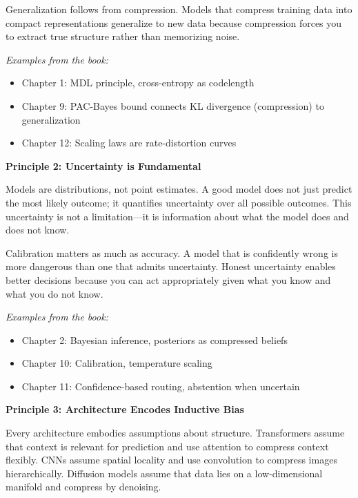 Generalization follows from compression. Models that compress training data into compact representations generalize to new data because compression forces you to extract true structure rather than memorizing noise.

\textit{Examples from the book:}
\begin{itemize}
\item Chapter 1: MDL principle, cross-entropy as codelength
\item Chapter 9: PAC-Bayes bound connects KL divergence (compression) to generalization
\item Chapter 12: Scaling laws are rate-distortion curves
\end{itemize}

\vspace{0.5em}

\textbf{Principle 2: Uncertainty is Fundamental}

Models are distributions, not point estimates. A good model does not just predict the most likely outcome; it quantifies uncertainty over all possible outcomes. This uncertainty is not a limitation---it is information about what the model does and does not know.

Calibration matters as much as accuracy. A model that is confidently wrong is more dangerous than one that admits uncertainty. Honest uncertainty enables better decisions because you can act appropriately given what you know and what you do not know.

\textit{Examples from the book:}
\begin{itemize}
\item Chapter 2: Bayesian inference, posteriors as compressed beliefs
\item Chapter 10: Calibration, temperature scaling
\item Chapter 11: Confidence-based routing, abstention when uncertain
\end{itemize}

\vspace{0.5em}

\textbf{Principle 3: Architecture Encodes Inductive Bias}

Every architecture embodies assumptions about structure. Transformers assume that context is relevant for prediction and use attention to compress context flexibly. CNNs assume spatial locality and use convolution to compress images hierarchically. Diffusion models assume that data lies on a low-dimensional manifold and compress by denoising.


